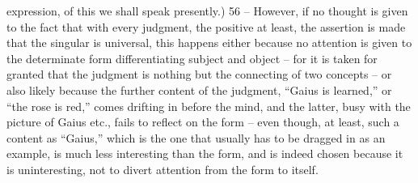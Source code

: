 expression, of this we shall speak presently.) 56 – However, if no thought
is given to the fact that with every judgment, the positive at least, the
assertion is made that the singular is universal, this happens either because
no attention is given to the determinate form differentiating subject and
object – for it is taken for granted that the judgment is nothing but the
connecting of two concepts – or also likely because the further content of
the judgment, “Gaius is learned,” or “the rose is red,” comes drifting in
before the mind, and the latter, busy with the picture of Gaius etc., fails to
reflect on the form – even though, at least, such a content as “Gaius,” which
is the one that usually has to be dragged in as an example, is much less
interesting than the form, and is indeed chosen because it is uninteresting,
not to divert attention from the form to itself.

